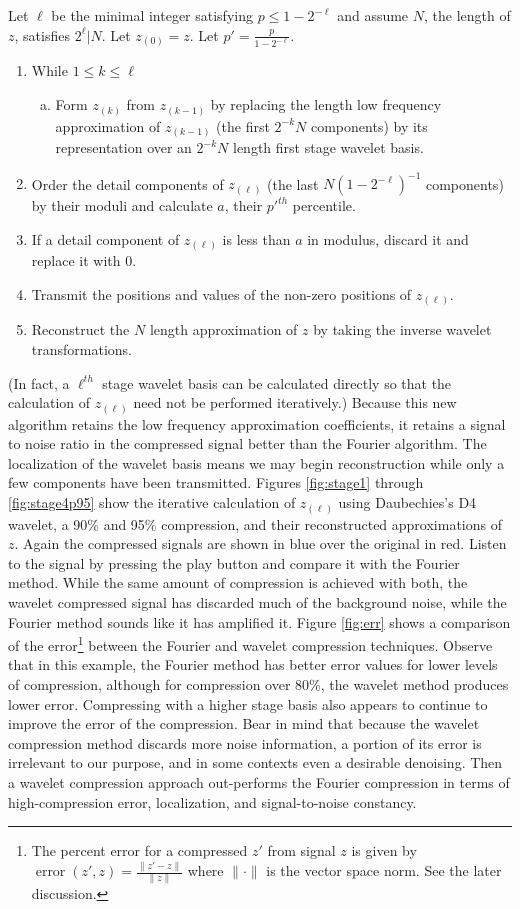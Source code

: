 \documentclass{report}
\DeclareMathOperator{\error}{error}
\begin{document}
Let $\ell$ be the minimal integer satisfying $p \leq 1-2^{-\ell}$ and assume $N$, the length of $z$, satisfies $2^\ell | N$. Let $z_{(0)}=z$. Let $p'=\frac{p}{1-2^{-\ell}}$.
\begin{enumerate}
\item While $1 \leq k \leq \ell$
	\begin{enumerate}[a.]
	\item Form $z_{(k)}$ from $z_{(k-1)}$ by replacing the length low frequency approximation of $z_{(k-1)}$  (the first $2^{-k}N$ components) by its representation over an $2^{-k}N$ length first stage wavelet basis.
	\end{enumerate}
\item Order the detail components of $z_{(\ell)}$ (the last  $N(1-2^{-\ell})^{-1}$ components) by their moduli and calculate $a$, their $p'^{th}$ percentile.
\item If a detail component of $z_{(\ell)}$ is less than $a$ in modulus, discard it and replace it with $0$.
\item Transmit the positions and values of the non-zero positions of $z_{(\ell)}$.
\item Reconstruct the $N$ length approximation of $z$ by taking the inverse wavelet transformations.
\end{enumerate}
(In fact, a $\ell^{th}$ stage wavelet basis can be calculated directly so that the calculation of $z_{(\ell)}$ need not be performed iteratively.) Because this new algorithm retains the low frequency approximation coefficients,  it retains a signal to noise ratio in the compressed signal better than the Fourier algorithm. The localization of the wavelet basis means we may begin reconstruction while only a few components have been transmitted. Figures \ref{fig:stage1} through \ref{fig:stage4p95} show the iterative calculation of $z_{(\ell)}$ using Daubechies's D4 wavelet, a 90\% and 95\% compression, and their reconstructed approximations of $z$. Again the compressed signals are shown in blue over the original in red. Listen to the signal by pressing the play button  and compare it with the Fourier method. While the same amount of compression is achieved with both, the wavelet compressed signal has discarded much of the background noise, while the Fourier method sounds like it has amplified it. Figure \ref{fig:err} shows a comparison of the 
error\footnote {
The percent error for a compressed $z'$ from signal $z$ is given by $\error(z',z)=\frac{\|z'-z\|}{\|z\|}$ where $\|\cdot\|$ is the vector space norm. See the later discussion.
}
between the Fourier and wavelet compression techniques. Observe that in this example, the Fourier method has better error values for lower levels of compression, although for compression over 80\%, the wavelet method produces lower error. Compressing with a higher stage basis also appears to continue to improve the error of the compression. Bear in mind that because the wavelet compression method discards more noise information, a portion of its error is irrelevant to our purpose, and in some contexts even a desirable denoising. Then a wavelet compression approach out-performs the Fourier compression in terms of  high-compression error, localization, and signal-to-noise constancy.
\end{document}
